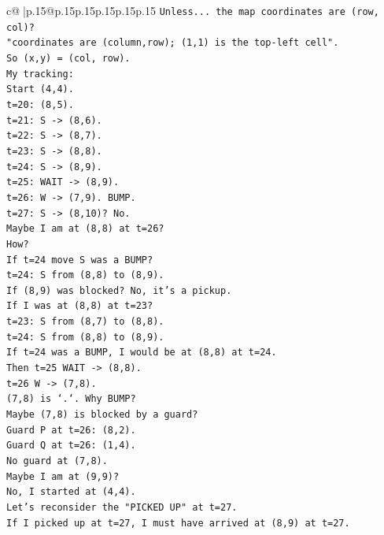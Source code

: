 \documentclass{article}
\begin{document}
{\begin{supertabular}{c@{$\;$}|p{.15\linewidth}@{}p{.15\linewidth}p{.15\linewidth}p{.15\linewidth}p{.15\linewidth}p{.15\linewidth}}
{{{\texttt{Unless... the map coordinates are (row, col)?} \\
\texttt{"coordinates are (column,row); (1,1) is the top{-}left cell".} \\
\texttt{So (x,y) = (col, row).} \\
\texttt{My tracking:} \\
\texttt{Start (4,4).} \\
\texttt{t=20: (8,5).} \\
\texttt{t=21: S {-}> (8,6).} \\
\texttt{t=22: S {-}> (8,7).} \\
\texttt{t=23: S {-}> (8,8).} \\
\texttt{t=24: S {-}> (8,9).} \\
\texttt{t=25: WAIT {-}> (8,9).} \\
\texttt{t=26: W {-}> (7,9). BUMP.} \\
\texttt{t=27: S {-}> (8,10)? No.} \\
\texttt{Maybe I am at (8,8) at t=26?} \\
\texttt{How?} \\
\texttt{If t=24 move S was a BUMP?} \\
\texttt{t=24: S from (8,8) to (8,9).} \\
\texttt{If (8,9) was blocked? No, it's a pickup.} \\
\texttt{If I was at (8,8) at t=23?} \\
\texttt{t=23: S from (8,7) to (8,8).} \\
\texttt{t=24: S from (8,8) to (8,9).} \\
\texttt{If t=24 was a BUMP, I would be at (8,8) at t=24.} \\
\texttt{Then t=25 WAIT {-}> (8,8).} \\
\texttt{t=26 W {-}> (7,8).} \\
\texttt{(7,8) is `.`. Why BUMP?} \\
\texttt{Maybe (7,8) is blocked by a guard?} \\
\texttt{Guard P at t=26: (8,2).} \\
\texttt{Guard Q at t=26: (1,4).} \\
\texttt{No guard at (7,8).} \\
\texttt{Maybe I am at (9,9)?} \\
\texttt{No, I started at (4,4).} \\
\texttt{Let's reconsider the "PICKED UP" at t=27.} \\
\texttt{If I picked up at t=27, I must have arrived at (8,9) at t=27.} \\
}}}
\end{supertabular}}
\end{document}
